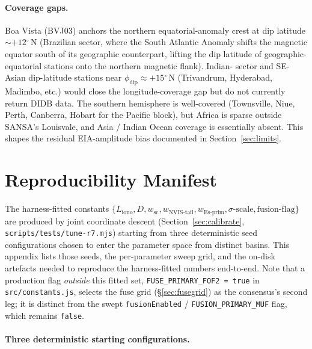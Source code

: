 \documentclass[11pt,a4paper]{article}
\newcommand{\degree}{\ensuremath{{}^\circ}}
\begin{document}
\paragraph{Coverage gaps.}  Boa Vista (BVJ03) anchors the
northern equatorial-anomaly crest at dip latitude
${\sim}+12\degree$\,N (Brazilian sector, where the South
Atlantic Anomaly shifts the magnetic equator south of its
geographic counterpart, lifting the dip latitude of geographic-
equatorial stations onto the northern magnetic flank).  Indian-
sector and SE-Asian dip-latitude stations near
$\phi_{\text{dip}} \approx +15\degree$\,N (Trivandrum,
Hyderabad, Madimbo, etc.) would close the longitude-coverage
gap but do not currently return DIDB data.  The southern
hemisphere is well-covered (Townsville, Niue, Perth, Canberra,
Hobart for the Pacific block), but Africa is sparse outside
SANSA's Louisvale, and Asia / Indian Ocean coverage is
essentially absent.  This shapes the residual EIA-amplitude
bias documented in Section~\ref{sec:limits}.

\section{Reproducibility Manifest}\label{app:repro}

The harness-fitted constants $\{L_{\text{iono}}, D, w_{\text{sc}},
w_{\text{NVIS-tail}}, w_{\text{Es-prim}}, \sigma\text{-scale},
\text{fusion-flag}\}$ are produced by joint coordinate descent
(Section~\ref{sec:calibrate},
\texttt{scripts/tests/tune-r7.mjs}) starting
from three deterministic seed configurations chosen to enter the
parameter space from distinct basins.  This appendix lists those
seeds, the per-parameter sweep grid, and the on-disk artefacts
needed to reproduce the harness-fitted numbers end-to-end.
Note that a production flag \emph{outside} this fitted set,
\texttt{FUSE\_PRIMARY\_FOF2 = true} in \texttt{src/constants.js},
selects the fuse grid (\S\ref{sec:fusegrid}) as the consensus's
second leg; it is distinct from the swept
\texttt{fusionEnabled} / \texttt{FUSION\_PRIMARY\_MUF} flag,
which remains \texttt{false}.

\paragraph{Three deterministic starting configurations.}
\end{document}
